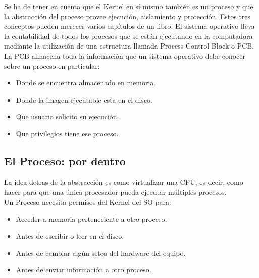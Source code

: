\documentclass[../main.tex]{subfiles}
\begin{document}
            Se ha de tener en cuenta que el Kernel en sí mismo también es un proceso y que la abstracción del proceso provee ejecución, aislamiento y protección. Estos tres conceptos pueden merecer varios capítulos de un libro. El sistema operativo lleva la contabilidad de todos los procesos que se están ejecutando en la computadora mediante la utilización de una estructura llamada Process Control Block o PCB. La PCB almacena toda la información que un sistema operativo debe conocer sobre un proceso en particular:

            \begin{itemize}
                \item Donde se encuentra almacenado en memoria.
                \item Donde la imagen ejecutable esta en el disco.
                \item Que usuario solicito su ejecución.
                \item Que privilegios tiene ese proceso.
            \end{itemize}

    \subsection{El Proceso: por dentro}
        La idea detras de la abstracción es como virtualizar una CPU, es decir, como hacer para que una única procesador pueda ejecutar múltiples procesos.\\

        Un Proceso necesita permisos del Kernel del SO para:
        \begin{itemize}
            \item Acceder a memoria perteneciente a otro proceso.
            \item Antes de escribir o leer en el disco.
            \item Antes de cambiar algún seteo del hardware del equipo.
            \item Antes de enviar información a otro proceso.
        \end{itemize}
\end{document}
